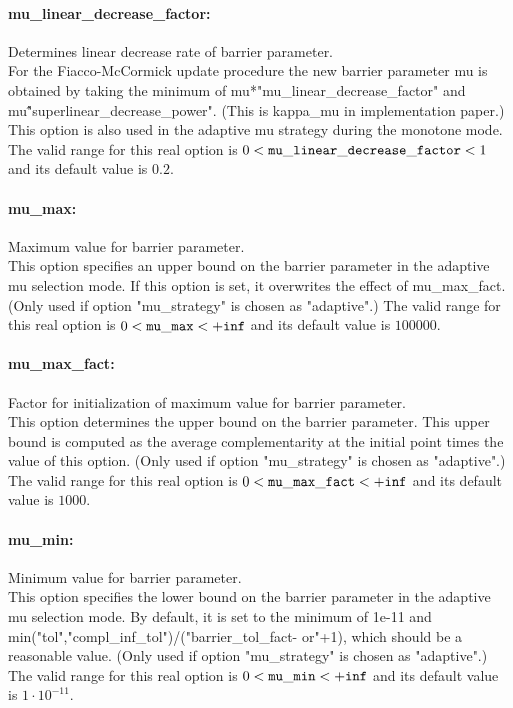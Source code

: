 \paragraph{mu\_linear\_decrease\_factor:}\label{sec:mu_linear_decrease_factor} Determines linear decrease rate of barrier parameter. $\;$ \\
 For the Fiacco-McCormick update procedure the new
barrier parameter mu is obtained by taking the
minimum of mu*"mu\_linear\_decrease\_factor" and
mu\^"superlinear\_decrease\_power".  (This is
kappa\_mu in implementation paper.) This option
is also used in the adaptive mu strategy during
the monotone mode. The valid range for this real option is 
$0 <  {\tt mu\_linear\_decrease\_factor } <  1$
and its default value is $0.2$.


\paragraph{mu\_max:}\label{sec:mu_max} Maximum value for barrier parameter. $\;$ \\
 This option specifies an upper bound on the
barrier parameter in the adaptive mu selection
mode.  If this option is set, it overwrites the
effect of mu\_max\_fact. (Only used if option
"mu\_strategy" is chosen as "adaptive".) The valid range for this real option is 
$0 <  {\tt mu\_max } <  {\tt +inf}$
and its default value is $100000$.


\paragraph{mu\_max\_fact:}\label{sec:mu_max_fact} Factor for initialization of maximum value for barrier parameter. $\;$ \\
 This option determines the upper bound on the
barrier parameter.  This upper bound is computed
as the average complementarity at the initial
point times the value of this option. (Only used
if option "mu\_strategy" is chosen as "adaptive".) The valid range for this real option is 
$0 <  {\tt mu\_max\_fact } <  {\tt +inf}$
and its default value is $1000$.


\paragraph{mu\_min:}\label{sec:mu_min} Minimum value for barrier parameter. $\;$ \\
 This option specifies the lower bound on the
barrier parameter in the adaptive mu selection
mode. By default, it is set to the minimum of
1e-11 and
min("tol","compl\_inf\_tol")/("barrier\_tol\_fact-
or"+1), which should be a reasonable value. (Only
used if option "mu\_strategy" is chosen as
"adaptive".) The valid range for this real option is 
$0 <  {\tt mu\_min } <  {\tt +inf}$
and its default value is $1 \cdot 10^{-11}$.


